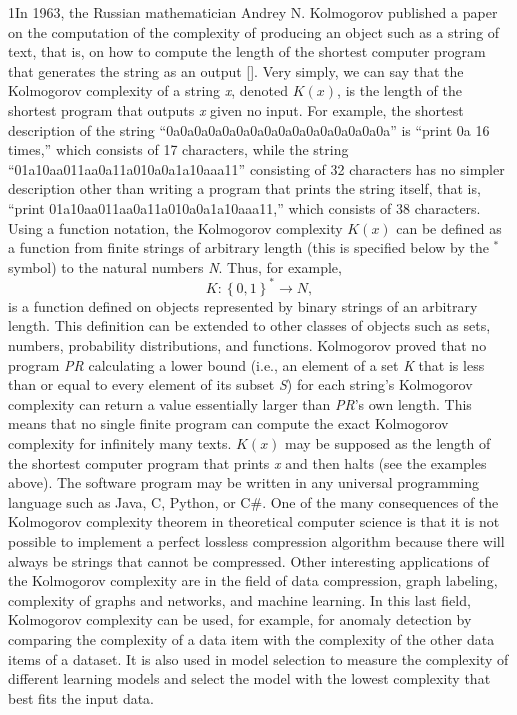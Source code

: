 \looseness1In 1963, the Russian mathematician Andrey N. Kolmogorov published a paper on the computation of the complexity of producing an object such as a string of text, that is, on how to compute the length of the shortest computer program that generates the string as an output [\citealt{chap:11:Kolmogorov:1963}]. Very simply, we can say that the Kolmogorov complexity of a string \textit{x}, denoted $K(x)$, is the length of the shortest program that outputs \textit{x} given no input. For example, the shortest description of the string ``0a0a0a0a0a0a0a0a0a0a0a0a0a0a0a0a'' is ``print 0a 16 times,'' which consists of 17 characters, while the string ``01a10aa011aa0a11a010a0a1a10aaa11'' consisting of 32 characters has no simpler description other than writing a program that prints the string itself, that is, ``print 01a10aa011aa0a11a010a0a1a10aaa11,'' which consists of 38 characters. Using a function notation, the Kolmogorov complexity $K(x)$ can be defined as a function from finite strings of arbitrary length (this is specified below by the $^*$ symbol) to the natural numbers \textit{N}. Thus, for example,\vspace*{-3pt}
\[
K:\left\{0,1\right\}^*\to N,
\]
is a function defined on objects represented by binary strings of an arbitrary length. This definition can be extended to other classes of objects such as sets, numbers, probability distributions, and functions. Kolmogorov proved that no program \textit{PR} calculating a lower bound (i.e., an element of a set \textit{K} that is less than or equal to every element of its subset \textit{S}) for each string's Kolmogorov complexity can return a value essentially larger than \textit{PR}'s own length. This means that no single finite program can compute the exact Kolmogorov complexity for infinitely many texts. $K(x)$ may be supposed as the length of the shortest computer program that prints \textit{x} and then halts (see the examples above). The software program may be written in any universal programming language such as Java, C, Python, or C\#. One of the many consequences of the Kolmogorov complexity theorem in theoretical computer science is that it is not possible to implement a perfect lossless compression algorithm because there will always be strings that cannot be compressed. Other interesting applications of the Kolmogorov complexity are in the field of data compression, graph labeling, complexity of graphs and networks, and machine learning. In this last field, Kolmogorov complexity can be used, for example, for anomaly detection by comparing the complexity of a data item with the complexity of the other data items of a dataset. It is also used in model selection to measure the complexity of different learning models and select the model with the lowest complexity that best fits the input data.

